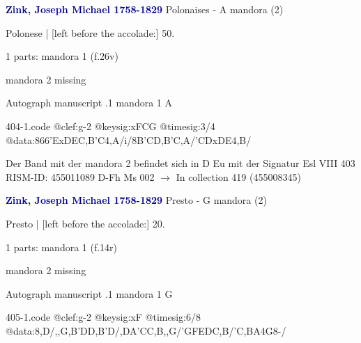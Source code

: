 \documentclass[twocolumn]{book}
\begin{document}
\newline \par \vspace{7pt} \textcolor{darkblue}{\textbf{Zink, Joseph Michael  1758-1829}}
\newline Polonaises - A
\newline mandora (2)
\newline \begin{itshape}[f.26v, at left:] Polonese | [left before the accolade:] 50.\end{itshape} 
\newline \textcolor{darkblue}{}  1 parts: mandora 1  (f.26v)
\newline \begin{small} mandora 2 missing\end{small} 
\newline Autograph manuscript
.1  mandora 1  A  
\begin{filecontents*}{404-1.code}
@clef:g-2
@keysig:xFCG
@timesig:3/4
@data:{866'ExDE}{C,B'C}4,A/i/8{B'C}{D,B}{'C,A}/{'CD}{xDE}4,B/
\end{filecontents*}
\newline
%

\newline Der Band mit der mandora 2 befindet sich in D Eu mit der Signatur Esl VIII 403
\newline RISM-ID: 455011089
\newline D-Fh  Ms 002
\newline $\rightarrow$ In collection 419 (455008345)
      
\newline \par \vspace{7pt} \textcolor{darkblue}{\textbf{Zink, Joseph Michael  1758-1829}}
\newline Presto - G
\newline mandora (2)
\newline \begin{itshape}[f.14r, at left:] Presto | [left before the accolade:] 20.\end{itshape} 
\newline \textcolor{darkblue}{}  1 parts: mandora 1  (f.14r)
\newline \begin{small} mandora 2 missing\end{small} 
\newline Autograph manuscript
.1  mandora 1  G  
\begin{filecontents*}{405-1.code}
@clef:g-2
@keysig:xF
@timesig:6/8
@data:8,D/,,G,B'DD,B'D/,DA'CC,B,,G/{'GFE}{DC,B}/'C,BA4G8-/
\end{filecontents*}
\newline
%
\end{document}
